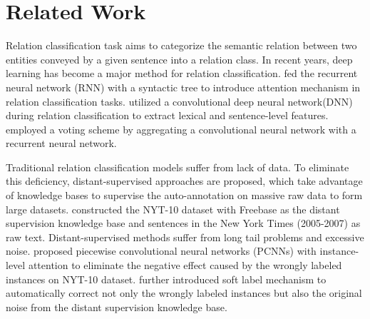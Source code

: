 \section{Related Work}
Relation classification task aims to categorize the semantic relation between two entities conveyed by a given sentence into a relation class. In recent years, deep learning has become a major method for relation classification. \citet{RecursiveNNRC} fed the recurrent neural network (RNN) with a syntactic tree to introduce attention mechanism in relation classification tasks. \citet{zeng-etal-2014-relation} utilized a convolutional deep neural network(DNN) during relation classification to extract lexical and sentence-level features. \citet{vu-etal-2016-combining} employed a voting scheme by aggregating a convolutional neural network with a recurrent neural network.

Traditional relation classification models suffer from lack of data. To eliminate this deficiency, distant-supervised approaches are proposed, which take advantage of knowledge bases to supervise the auto-annotation on massive raw data to form large datasets. \citet{NYTdataset} constructed the NYT-10 dataset with Freebase \citep{Freebase} as the distant supervision knowledge base and sentences in the New York Times (2005-2007) as raw text. Distant-supervised methods suffer from long tail problems and excessive noise. \citet{zeng-etal-2015-distant} proposed piecewise convolutional neural networks (PCNNs) with instance-level attention to eliminate the negative effect caused by the wrongly labeled instances on NYT-10 dataset. \citet{liu-etal-2017-soft} further introduced soft label mechanism to automatically correct not only the wrongly labeled instances but also the original noise from the distant supervision knowledge base.

